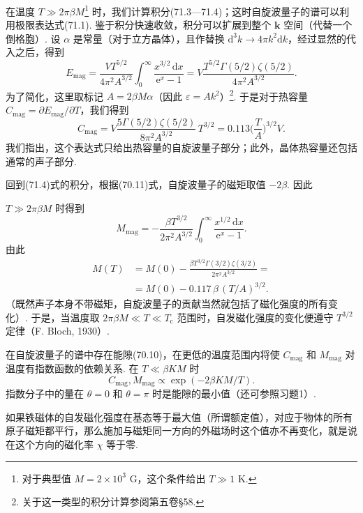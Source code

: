 在温度 $T\gg2\pi\beta M$\footnote{对于典型值 $M=2\times10^3$ G，这个条件给出 $T\gg1$ K.} 时，我们计算积分(71.3—71.4)；这时自旋波量子的谱可以利用极限表达式(71.1). 鉴于积分快速收敛，积分可以扩展到整个 $\bm{k}$ 空间（代替一个倒格胞）. 设 $\alpha$ 是常量（对于立方晶体），且作替换 $\mathrm{d}^3k\to4\pi k^2\mathrm{d}k$，经过显然的代入之后，得到
\begin{equation*}
E_{\mathrm{mag}}=\frac{VT^{5/2}}{4\pi^2A^{3/2}}
\int_0^{\infty}\frac{x^{3/2}\,\mathrm{d}x}{\mathrm{e}^x-1}
=V\frac{T^{5/2}\varGamma(5/2)\zeta(5/2)}{4\pi^2A^{3/2}}.
\end{equation*}
为了简化，这里取标记 $A=2\beta M\alpha$（因此 $\varepsilon=Ak^2$）\footnote{关于这一类型的积分计算参阅第五卷§58.}. 于是对于热容量 $C_{\mathrm{mag}}=\partial E_{\mathrm{mag}}/\partial T$，我们得到
\begin{equation}
C_{\mathrm{mag}}=V\frac{5\varGamma(5/2)\zeta(5/2)}{8\pi^2A^{3/2}}\,T^{3/2}
=0.113\biggl(\frac{T}{A}\biggr)^{\!3/2}V.
\end{equation}
我们指出，这个表达式只给出热容量的自旋波量子部分；此外，晶体热容量还包括通常的声子部分.

回到(71.4)式的积分，根据(70.11)式，自旋波量子的磁矩取值 $-2\beta$. 因此

$T\gg2\pi\beta M$ 时得到
\begin{equation}
M_{\mathrm{mag}}=-\frac{\beta T^{3/2}}{2\pi^2A^{3/2}}
\int_0^{\infty}\frac{x^{1/2}\,\mathrm{d}x}{\mathrm{e}^x-1}.
\end{equation}
由此
\begin{equation}
\begin{aligned}
M(T)&=M(0)-\frac{\beta T^{3/2}\varGamma(3/2)\zeta(3/2)}{2\pi^2A^{3/2}}={}\\
&=M(0)-0.117\,\beta\,(T/A)^{3/2}.
\end{aligned}
\end{equation}
（既然声子本身不带磁矩，自旋波量子的贡献当然就包括了磁化强度的所有变化）. 于是，当温度取 $2\pi\beta M\ll T\ll T_{\mathrm{c}}$ 范围时，自发磁化强度的变化便遵守 $T^{3/2}$ 定律（F. Bloch, 1930）.

在自旋波量子的谱中存在能隙(70.10)，在更低的温度范围内将使 $C_{\mathrm{mag}}$ 和 $M_{\mathrm{mag}}$ 对温度有指数函数的依赖关系. 在 $T\ll\beta KM$ 时
\begin{equation}
C_{\mathrm{mag}},M_{\mathrm{mag}}\propto\exp(-2\beta KM/T).
\end{equation}
指数分子中的量在 $\theta=0$ 和 $\theta=\pi$ 时是能隙的最小值（还可参照习题1）.

如果铁磁体的自发磁化强度在基态等于最大值（所谓额定值），对应于物体的所有原子磁矩都平行，那么施加与磁矩同一方向的外磁场时这个值亦不再变化，就是说在这个方向的磁化率 $\chi$ 等于零.

